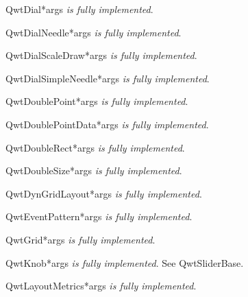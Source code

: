 \documentclass{manual}
\begin{document}
\begin{classdesc}{QwtDial}{*args}
\emph{is fully implemented}.
\end{classdesc}

\begin{classdesc}{QwtDialNeedle}{*args}
\emph{is fully implemented}.
\end{classdesc}

\begin{classdesc}{QwtDialScaleDraw}{*args}
\emph{is fully implemented}.
\end{classdesc}

\begin{classdesc}{QwtDialSimpleNeedle}{*args}
\emph{is fully implemented}.
\end{classdesc}

\begin{classdesc}{QwtDoublePoint}{*args}
\emph{is fully implemented}.
\end{classdesc}

\begin{classdesc}{QwtDoublePointData}{*args}
\emph{is fully implemented}.
\end{classdesc}

\begin{classdesc}{QwtDoubleRect}{*args}
\emph{is fully implemented}.
\end{classdesc}

\begin{classdesc}{QwtDoubleSize}{*args}
\emph{is fully implemented}.
\end{classdesc}

\begin{classdesc}{QwtDynGridLayout}{*args}
\emph{is fully implemented}.
\end{classdesc}

\begin{classdesc}{QwtEventPattern}{*args}
\emph{is fully implemented}.
\end{classdesc}

\begin{classdesc}{QwtGrid}{*args}
\emph{is fully implemented}.
\end{classdesc}

\begin{classdesc}{QwtKnob}{*args}
\emph{is fully implemented}. See QwtSliderBase.
\end{classdesc}

\begin{classdesc}{QwtLayoutMetrics}{*args}
\emph{is fully implemented}.
\end{classdesc}
\end{document}
